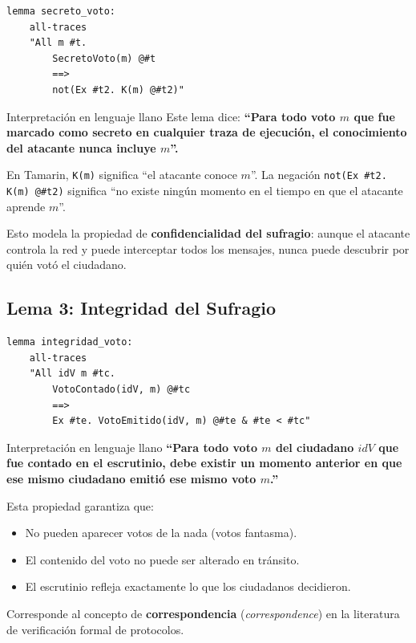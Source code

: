 \documentclass[12pt, a4paper]{article}
\begin{document}
\begin{lstlisting}[caption={Lema: El atacante nunca aprende el contenido del voto.}]
lemma secreto_voto:
    all-traces
    "All m #t.
        SecretoVoto(m) @#t
        ==>
        not(Ex #t2. K(m) @#t2)"
\end{lstlisting}

\begin{cajaConceto}{Interpretación en lenguaje llano}
Este lema dice: \textbf{``Para todo voto $m$ que fue marcado como secreto
en cualquier traza de ejecución, el conocimiento del atacante nunca incluye
$m$''.}

En Tamarin, \texttt{K(m)} significa ``el atacante conoce $m$''. La negación
\texttt{not(Ex \#t2. K(m) @\#t2)} significa ``no existe ningún momento en
el tiempo en que el atacante aprende $m$''.

Esto modela la propiedad de \textbf{confidencialidad del sufragio}: aunque
el atacante controla la red y puede interceptar todos los mensajes, nunca
puede descubrir por quién votó el ciudadano.
\end{cajaConceto}

\subsection{Lema 3: Integridad del Sufragio}

\begin{lstlisting}[caption={Lema: Todo voto contado fue legítimamente emitido.}]
lemma integridad_voto:
    all-traces
    "All idV m #tc.
        VotoContado(idV, m) @#tc
        ==>
        Ex #te. VotoEmitido(idV, m) @#te & #te < #tc"
\end{lstlisting}

\begin{cajaConceto}{Interpretación en lenguaje llano}
\textbf{``Para todo voto $m$ del ciudadano $idV$ que fue contado en el
escrutinio, debe existir un momento anterior en que ese mismo ciudadano
emitió ese mismo voto $m$.''}

Esta propiedad garantiza que:
\begin{itemize}[itemsep=2pt]
  \item No pueden aparecer votos de la nada (votos fantasma).
  \item El contenido del voto no puede ser alterado en tránsito.
  \item El escrutinio refleja exactamente lo que los ciudadanos decidieron.
\end{itemize}
Corresponde al concepto de \textbf{correspondencia} (\textit{correspondence})
en la literatura de verificación formal de protocolos.
\end{cajaConceto}
\end{document}
